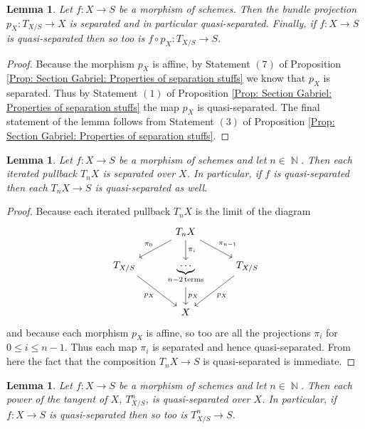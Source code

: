 \documentclass{amsart}
\newtheorem{lemma}[equation]{Lemma}
\theoremstyle{definition}
\DeclareMathOperator{\N}{\mathbb{N}}
\numberwithin{equation}{subsection}
\begin{document}
\begin{lemma}\label{Lemma: Section Gabriel: Tangent scheme is qs over scheme}
Let $f:X \to S$ be a morphism of schemes. Then the bundle projection $p_{X}:T_{X/S} \to X$ is separated and in particular quasi-separated. Finally, if $f:X \to S$ is quasi-separated then so too is $f \circ p_X:T_{X/S} \to S$.
\end{lemma}
\begin{proof}
Because the morphism $p_{X}$ is affine, by Statement $(7)$ of Proposition \ref{Prop: Section Gabriel: Properties of separation stuffs} we know that $p_X$ is separated. Thus by Statement $(1)$ of Proposition \ref{Prop: Section Gabriel: Properties of separation stuffs} the map $p_X$ is quasi-separated. The final statement of the lemma follows from Statement $(3)$ of Proposition \ref{Prop: Section Gabriel: Properties of separation stuffs}.
\end{proof}
\begin{lemma}\label{Lemma: Section Gabriel: Tangent scheme pullbacks is qs over scheme}
Let $f:X \to S$ be a morphism of schemes and let $n \in \N$. Then each iterated pullback $T_{n}X$ is separated over $X$. In particular, if $f$ is quasi-separated then each $T_nX \to S$ is quasi-separated as well.
\end{lemma}
\begin{proof}
Because each iterated pullback $T_nX$ is the limit of the diagram
\[
\begin{tikzcd}
 & T_nX \ar[dr]{}{\pi_{n-1}} \ar[d]{}{\pi_i} \ar[dl, swap]{}{\pi_0} \\
T_{X/S} \ar[dr, swap]{}{p_X} & \underbrace{\cdots}_{n-2\,\text{terms}} \ar[d]{}{p_X} & T_{X/S} \ar[dl]{}{p_X} \\
 & X
\end{tikzcd}
\]
and because each morphism $p_X$ is affine, so too are all the projections $\pi_i$ for $0\leq i \leq n-1$. Thus each map $\pi_i$ is separated and hence quasi-separated. From here the fact that the composition $T_{n}X \to S$ is quasi-separated is immediate.
\end{proof}
\begin{lemma}\label{Lemma: Section Gabriel: Powers of tangents are affine}
Let $f:X \to S$ be a morphism of schemes and let $n \in \N$. Then each power of the tangent of $X$, $T^n_{X/S}$, is quasi-separated over $X$. In particular, if $f:X \to S$ is quasi-separated then so too is $T_{X/S}^n \to S$.
\end{lemma}
\end{document}
